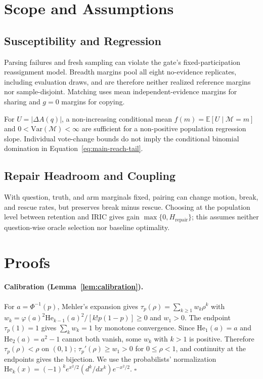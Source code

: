 \documentclass[11pt,a4paper]{article}
\theoremstyle{definition}
\newcommand{\Marg}{\mathcal{M}}
\newcommand{\Hrep}{H_{\mathrm{repair}}}
\newcommand{\tetra}{\tau_{p}}
\newcommand{\He}{\mathrm{He}}
\begin{document}
\section{Scope and Assumptions}
\label{sec:theory}
\label{sec:dependence-measurement}
\label{sec:decision-susceptibility}
\label{sec:repairability-method}
\label{sec:mechanism-non-equivalence}

\subsection{Susceptibility and Regression}
\label{sec:susceptibility-analysis}

Parsing failures and fresh sampling can violate the gate's fixed-participation
reassignment model. Breadth margins pool all eight no-evidence replicates,
including evaluation draws, and are therefore neither realized reference
margins nor sample-disjoint. Matching uses mean independent-evidence margins
for sharing and $g=0$ margins for copying.

For $U=|\Delta A(q)|$, a non-increasing conditional mean
$f(m)=\mathbb E[U\mid\Marg=m]$ and
$0<\mathrm{Var}(\Marg)<\infty$ are sufficient for a non-positive
population regression slope. Individual vote-change bounds do not imply
the conditional binomial domination in Equation~\ref{eq:main-reach-tail}.

\subsection{Repair Headroom and Coupling}
\label{sec:repairability-bounds}

With question, truth, and arm marginals fixed, pairing can change motion,
break, and rescue rates, but preserves break minus rescue. Choosing at the
population level between retention and IRIC gives gain $\max\{0,\Hrep\}$;
this assumes neither question-wise oracle selection nor baseline optimality.

\section{Proofs}
\label{sec:app-proofs}

\paragraph{Calibration (Lemma~\ref{lem:calibration}).}
For $a=\Phi^{-1}(p)$, Mehler's expansion gives
$\tetra(\rho)=\sum_{k\ge1}w_k\rho^k$ with
$w_k=\varphi(a)^2\He_{k-1}(a)^2/[k!p(1-p)]\ge0$ and $w_1>0$.
The endpoint $\tetra(1)=1$ gives $\sum_kw_k=1$ by monotone convergence.
Since $\He_1(a)=a$ and $\He_2(a)=a^2-1$ cannot both vanish, some
$w_k$ with $k>1$ is positive. Therefore $\tetra(\rho)<\rho$ on $(0,1)$;
$\tetra'(\rho)\ge w_1>0$ for $0\le\rho<1$, and continuity at the endpoints
gives the bijection. We use the probabilists' normalization
$\He_k(x)=(-1)^k e^{x^2/2}(d^k/dx^k)e^{-x^2/2}$.
\hfill$\square$
\end{document}
